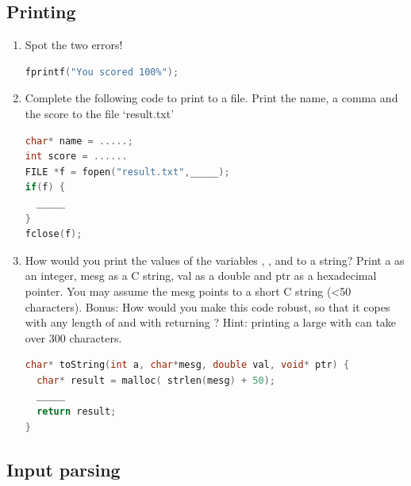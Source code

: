 \subsection{Printing}

\begin{enumerate}

\item Spot the two errors!

\begin{lstlisting}[language=C]
fprintf("You scored 100%");
\end{lstlisting}

\item Complete the following code to print to a file. Print the name, a comma and the score to the file `result.txt'

\begin{lstlisting}[language=C]
char* name = .....;
int score = ......
FILE *f = fopen("result.txt",_____);
if(f) {
  _____
}
fclose(f);
\end{lstlisting}

\item How would you print the values of the variables , ,  and  to a string? Print a as an integer, mesg as a C string, val as a double and ptr as a hexadecimal pointer. You may assume the mesg points to a short C string (\textless{}50 characters). Bonus: How would you make this code robust, so that it copes with any length of  and with  returning ? Hint: printing a large  with  can take over 300 characters.

\begin{lstlisting}[language=C]
char* toString(int a, char*mesg, double val, void* ptr) {
  char* result = malloc( strlen(mesg) + 50);
  _____
  return result;
}
\end{lstlisting}

\end{enumerate}

\subsection{Input parsing}

